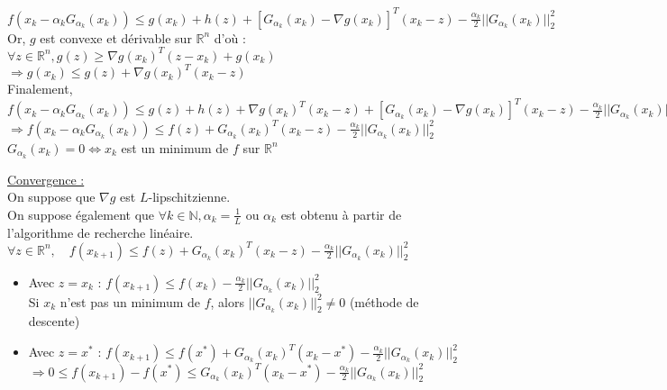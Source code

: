 \documentclass[12pt,a4paper]{article}
\begin{document}
{    $f(x_k - \alpha_k G_{\alpha_k}(x_k)) \leq g(x_k) + h(z) + [G_{\alpha_k}(x_k) - \nabla g(x_k)]^T (x_k - z) - \frac{\alpha_k}{2} ||G_{\alpha_k}(x_k)||_2^2$\\
    
    Or, $g$ est convexe et dérivable sur $\mathbb{R}^n$ d'où :\\
    $\forall z \in \mathbb{R}^n, g(z) \geq \nabla g(x_k)^T (z - x_k) + g(x_k)$\\
    $\Rightarrow g(x_k) \leq g(z) + \nabla g(x_k)^T (x_k - z)$\\

    Finalement, $f(x_k - \alpha_k G_{\alpha_k}(x_k)) \leq g(z) + h(z) + \nabla g(x_k)^T (x_k - z) + [G_{\alpha_k}(x_k) - \nabla g(x_k)]^T (x_k - z) - \frac{\alpha_k}{2} ||G_{\alpha_k}(x_k)||_2^2$\\
    $\Rightarrow f(x_k - \alpha_k G_{\alpha_k}(x_k)) \leq f(z) + G_{\alpha_k}(x_k)^T (x_k - z) - \frac{\alpha_k}{2} ||G_{\alpha_k}(x_k)||_2^2$\\

    $G_{\alpha_k}(x_k) = 0 \Leftrightarrow x_k$ est un minimum de $f$ sur $\mathbb{R}^n$
}


\noindent \underline{Convergence :}\\
On suppose que $\nabla g$ est $L$-lipschitzienne.\\
On suppose également que $\forall k \in \mathbb{N}, \alpha_k = \frac{1}{L}$ ou $\alpha_k$ est obtenu à partir de l'algorithme de recherche linéaire.\\

\noindent $\forall z \in \mathbb{R}^n, \quad f(x_{k+1}) \leq f(z) + G_{\alpha_k}(x_k)^T (x_k - z) - \frac{\alpha_k}{2} ||G_{\alpha_k}(x_k)||_2^2$\\
\begin{itemize}
    \item Avec $z = x_k$ : $f(x_{k+1}) \leq f(x_k) - \frac{\alpha_k}{2} ||G_{\alpha_k}(x_k)||_2^2$\\
    Si $x_k$ n'est pas un minimum de $f$, alors $||G_{\alpha_k}(x_k)||_2^2 \neq 0$ (méthode de descente)\\

    \item Avec $z = x^*$ : $f(x_{k+1}) \leq f(x^*) + G_{\alpha_k}(x_k)^T (x_k - x^*) - \frac{\alpha_k}{2} ||G_{\alpha_k}(x_k)||_2^2$\\
    $\Rightarrow 0 \leq f(x_{k+1}) - f(x^*) \leq G_{\alpha_k}(x_k)^T (x_k - x^*) - \frac{\alpha_k}{2} ||G_{\alpha_k}(x_k)||_2^2$
\end{itemize}
\end{document}
